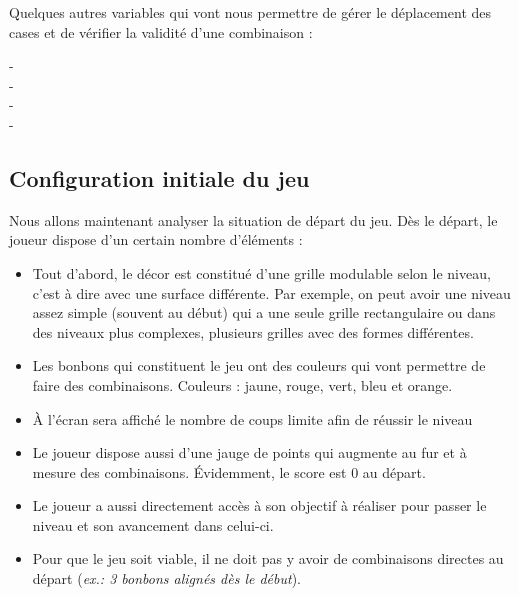   Quelques autres variables qui vont nous permettre de gérer le déplacement des cases et de vérifier la validité d'une combinaison :
  
\begin{typeag}[Case]
 -       \\
 -       \\
 -		 \\
 -       
 \end{typeag}

\subsection{Configuration initiale du jeu}
Nous allons maintenant analyser la situation de départ du jeu. Dès le départ, le joueur dispose d'un certain nombre d'éléments :

\begin{itemize}

\item
	Tout d'abord, le décor est constitué d'une grille modulable selon le niveau, c'est à dire avec une surface différente.
	Par exemple, on peut avoir une niveau assez simple (souvent au début) qui a une seule grille rectangulaire ou dans des niveaux plus complexes, plusieurs grilles avec des formes différentes.
\item
	Les bonbons qui constituent le jeu ont des couleurs qui vont permettre de faire des combinaisons.
	Couleurs : jaune, rouge, vert, bleu et orange.
\item
	À l'écran sera affiché le nombre de coups limite afin de réussir le niveau %
\item
	Le joueur dispose aussi d'une jauge de points qui augmente au fur et à mesure des combinaisons.
	Évidemment, le score est 0 au départ.
\item
	Le joueur a aussi directement accès à son objectif à réaliser pour passer le niveau et son avancement dans celui-ci.
\item 
 	Pour que le jeu soit viable, il ne doit pas y avoir de combinaisons directes au départ (\emph{ex.: 3 bonbons alignés dès le début}).
	
\end{itemize}

